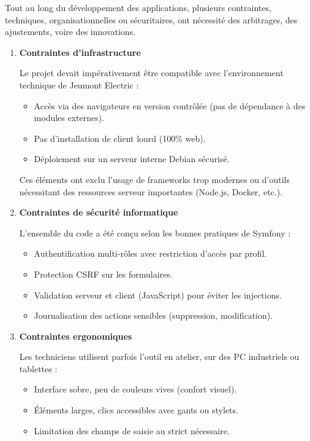 \documentclass[11pt,a4paper]{article}
\begin{document}
Tout au long du développement des applications, plusieurs contraintes, techniques, organisationnelles ou sécuritaires, ont nécessité des arbitrages, des ajustements, voire des innovations.
\begin{enumerate}


\item \textbf{Contraintes d’infrastructure} 

Le projet devait impérativement être compatible avec l’environnement technique de Jeumont Electric :
\begin{itemize}
    \item Accès via des navigateurs en version contrôlée (pas de dépendance à des modules externes).
    \item Pas d’installation de client lourd (100\% web).
    \item Déploiement sur un serveur interne Debian sécurisé.
\end{itemize}
Ces éléments ont exclu l’usage de frameworks trop modernes ou d’outils nécessitant des ressources serveur importantes (Node.js, Docker, etc.).

\item \textbf{Contraintes de sécurité informatique} \

L’ensemble du code a été conçu selon les bonnes pratiques de Symfony :
\begin{itemize}
    \item Authentification multi-rôles avec restriction d’accès par profil.
    \item Protection CSRF sur les formulaires.
    \item Validation serveur et client (JavaScript) pour éviter les injections.
    \item Journalisation des actions sensibles (suppression, modification).
\end{itemize}

\item \textbf{Contraintes ergonomiques}

Les techniciens utilisent parfois l’outil en atelier, sur des PC industriels ou tablettes :
\begin{itemize}
    \item Interface sobre, peu de couleurs vives (confort visuel).
    \item Éléments larges, clics accessibles avec gants ou stylets.
    \item Limitation des champs de saisie au strict nécessaire.
\end{itemize}


\end{enumerate}
\end{document}
